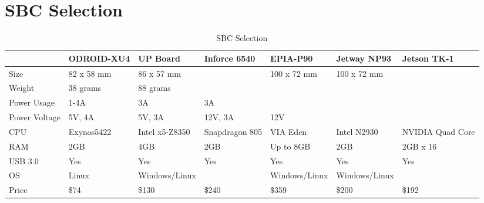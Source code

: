 \section{SBC Selection}
\begin{landscape}
    \begin{table}[ht]
    \caption{SBC Selection}
    \label{table:sbc_selection}
    \centering
    \begin{tabular}{|l|l|l|l|l|l|l|}
        \hline              & ODROID-XU4 & UP Board       & Inforce 6540   & EPIA-P90       & Jetway NP93   & Jetson TK-1      \\ \hline
        Size                & 82 x 58 mm & 86 x 57 mm     &                & 100 x 72 mm    & 100 x 72 mm   &                  \\
        Weight              & 38 grams   & 88 grams       &                &                &               &                  \\
        Power Usage         & 1-4A       & 3A             & 3A             &                &               &                  \\
        Power Voltage       & 5V, 4A     & 5V, 3A         & 12V, 3A        & 12V            &               &                  \\
        CPU                 & Exynos5422 & Intel x5-Z8350 & Snapdragon 805 & VIA Eden       & Intel N2930   & NVIDIA Quad Core \\
        RAM                 & 2GB        & 4GB            & 2GB            & Up to 8GB      & 2GB           & 2GB x 16         \\
        USB 3.0             & Yes        & Yes            & Yes            & Yes            & Yes           & Yes              \\
        OS                  & Linux      & Windows/Linux  &                & Windows/Linux  & Windows/Linux &                  \\
        Price               & \$74       & \$130          & \$240          & \$359          & \$200         & \$192            \\ \hline
    \end{tabular}
    \end{table}
\end{landscape} \par
